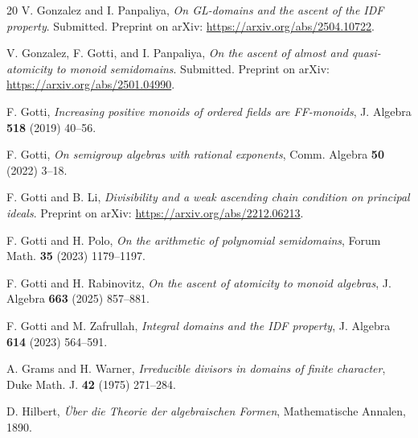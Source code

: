 \documentclass[10pt]{amsart}
\theoremstyle{definition}
\theoremstyle{remark}
\numberwithin{equation}{section}
\begin{document}
\begin{thebibliography}{20}
 V. Gonzalez and I. Panpaliya, \emph{On GL-domains and the ascent of the IDF property}. Submitted. Preprint on arXiv: \url{https://arxiv.org/abs/2504.10722}.

 V. Gonzalez, F. Gotti, and I. Panpaliya, \emph{On the ascent of almost and quasi-atomicity to monoid semidomains}. Submitted. Preprint on arXiv: \url{https://arxiv.org/abs/2501.04990}.

 F. Gotti, \emph{Increasing positive monoids of ordered fields are FF-monoids}, J. Algebra \textbf{518} (2019) 40--56.

 F. Gotti, \emph{On semigroup algebras with rational exponents}, Comm. Algebra \textbf{50} (2022) 3--18.

 F. Gotti and B. Li, \emph{Divisibility and a weak ascending chain condition on principal ideals}. Preprint on arXiv: \url{https://arxiv.org/abs/2212.06213}.



 F. Gotti and H. Polo, \emph{On the arithmetic of polynomial semidomains}, Forum Math. \textbf{35} (2023) 1179--1197.


 F. Gotti and H. Rabinovitz, \emph{On the ascent of atomicity to monoid algebras}, J. Algebra \textbf{663} (2025) 857--881.

 F. Gotti and M. Zafrullah, \emph{Integral domains and the IDF property}, J. Algebra \textbf{614} (2023) 564--591.

 A. Grams and H. Warner, \emph{Irreducible divisors in domains of finite character}, Duke Math. J. \textbf{42} (1975) 271--284.

 D. Hilbert, \emph{\"Uber die Theorie der algebraischen Formen}, Mathematische Annalen, 1890.


\end{thebibliography}
\end{document}
